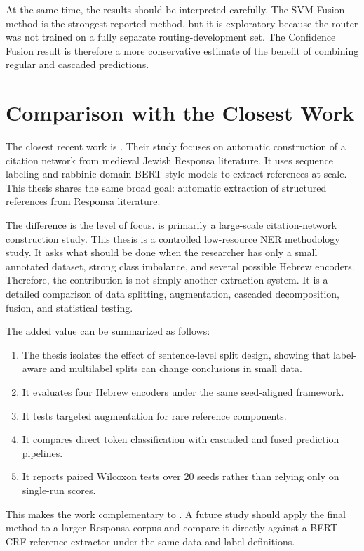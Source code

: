 \documentclass[12pt,a4paper]{report}
\begin{document}
At the same time, the results should be interpreted carefully. The SVM Fusion method is the strongest reported method, but it is exploratory because the router was not trained on a fully separate routing-development set. The Confidence Fusion result is therefore a more conservative estimate of the benefit of combining regular and cascaded predictions.

\chapter{Comparison with the Closest Work}
The closest recent work is \citet{bengigi2025}. Their study focuses on automatic construction of a citation network from medieval Jewish Responsa literature. It uses sequence labeling and rabbinic-domain BERT-style models to extract references at scale. This thesis shares the same broad goal: automatic extraction of structured references from Responsa literature.

The difference is the level of focus. \citet{bengigi2025} is primarily a large-scale citation-network construction study. This thesis is a controlled low-resource NER methodology study. It asks what should be done when the researcher has only a small annotated dataset, strong class imbalance, and several possible Hebrew encoders. Therefore, the contribution is not simply another extraction system. It is a detailed comparison of data splitting, augmentation, cascaded decomposition, fusion, and statistical testing.

The added value can be summarized as follows:
\begin{enumerate}[leftmargin=*]
\item The thesis isolates the effect of sentence-level split design, showing that label-aware and multilabel splits can change conclusions in small data.
\item It evaluates four Hebrew encoders under the same seed-aligned framework.
\item It tests targeted augmentation for rare reference components.
\item It compares direct token classification with cascaded and fused prediction pipelines.
\item It reports paired Wilcoxon tests over 20 seeds rather than relying only on single-run scores.
\end{enumerate}

This makes the work complementary to \citet{bengigi2025}. A future study should apply the final method to a larger Responsa corpus and compare it directly against a BERT-CRF reference extractor under the same data and label definitions.
\end{document}
